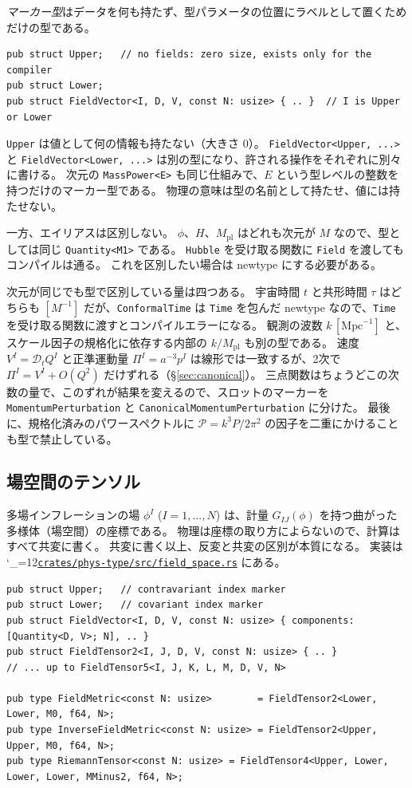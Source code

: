 \documentclass[a4paper,11pt]{ltjsarticle}
\newcommand{\Mpl}{M_{\mathrm{pl}}}
\newcommand{\code}[1]{\texttt{#1}}
\newcommand{\Dt}{\mathcal{D}_t}
\newcommand{\repourl}{https://github.com/inuverse44/phys-type}
\newcommand{\reporev}{b1fea87}
\newcommand{\repo}{\begingroup\catcode`\_=12\relax\repoaux}
\newcommand{\repoaux}[1]{\href{\repourl/blob/\reporev/#1}{\nolinkurl{#1}}\endgroup}
\begin{document}
\emph{マーカー型}はデータを何も持たず、型パラメータの位置にラベルとして置くためだけの型である。
\begin{lstlisting}
pub struct Upper;   // no fields: zero size, exists only for the compiler
pub struct Lower;
pub struct FieldVector<I, D, V, const N: usize> { .. }  // I is Upper or Lower
\end{lstlisting}
\code{Upper} は値として何の情報も持たない（大きさ 0）。
\code{FieldVector<Upper, ...>} と \code{FieldVector<Lower, ...>} は別の型になり、許される操作をそれぞれに別々に書ける。
次元の \code{MassPower<E>} も同じ仕組みで、$E$ という型レベルの整数を持つだけのマーカー型である。
物理の意味は型の名前として持たせ、値には持たせない。

一方、エイリアスは区別しない。
$\phi$、$H$、$\Mpl$ はどれも次元が $M$ なので、型としては同じ \code{Quantity<M1>} である。
\code{Hubble} を受け取る関数に \code{Field} を渡してもコンパイルは通る。
これを区別したい場合は newtype にする必要がある。

次元が同じでも型で区別している量は四つある。
宇宙時間 $t$ と共形時間 $\tau$ はどちらも $[M^{-1}]$ だが、\code{ConformalTime} は \code{Time} を包んだ newtype なので、\code{Time} を受け取る関数に渡すとコンパイルエラーになる。
観測の波数 $k\,[\mathrm{Mpc}^{-1}]$ と、スケール因子の規格化に依存する内部の $k/\Mpl$ も別の型である。
速度 $V^I=\Dt Q^I$ と正準運動量 $\Pi^I=a^{-3}p^I$ は線形では一致するが、2次で $\Pi^I=V^I+O(Q^2)$ だけずれる（\S\ref{sec:canonical}）。
三点関数はちょうどこの次数の量で、このずれが結果を変えるので、スロットのマーカーを \code{MomentumPerturbation} と \code{CanonicalMomentumPerturbation} に分けた。
最後に、規格化済みのパワースペクトルに $\mathcal P=k^3P/2\pi^2$ の因子を二重にかけることも型で禁止している。

\subsection{場空間のテンソル}

多場インフレーションの場 $\phi^I$ ($I=1,\dots,N$) は、計量 $G_{IJ}(\phi)$ を持つ曲がった多様体（場空間）の座標である。
物理は座標の取り方によらないので、計算はすべて共変に書く。
共変に書く以上、反変と共変の区別が本質になる。
実装は \repo{crates/phys-type/src/field_space.rs} にある。

\begin{lstlisting}
pub struct Upper;   // contravariant index marker
pub struct Lower;   // covariant index marker
pub struct FieldVector<I, D, V, const N: usize> { components: [Quantity<D, V>; N], .. }
pub struct FieldTensor2<I, J, D, V, const N: usize> { .. }
// ... up to FieldTensor5<I, J, K, L, M, D, V, N>

pub type FieldMetric<const N: usize>        = FieldTensor2<Lower, Lower, M0, f64, N>;
pub type InverseFieldMetric<const N: usize> = FieldTensor2<Upper, Upper, M0, f64, N>;
pub type RiemannTensor<const N: usize> = FieldTensor4<Upper, Lower, Lower, Lower, MMinus2, f64, N>;
\end{lstlisting}
\end{document}
